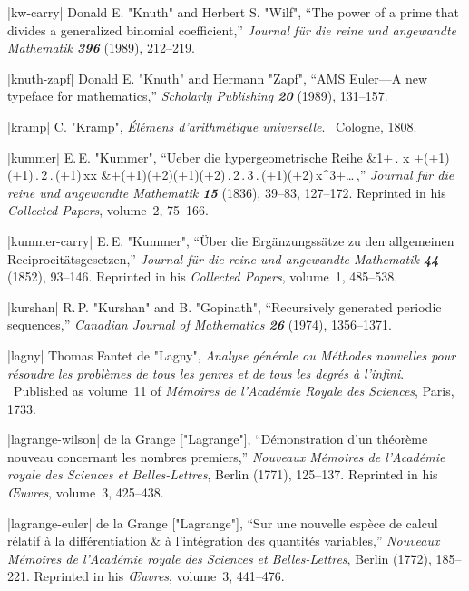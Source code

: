 \bib|kw-carry|%
Donald E. "Knuth" and Herbert S. "Wilf", ``The power of a prime that
divides a generalized binomial coefficient,'' 
{\sl Journal f\"ur die reine und angewandte Mathematik\/ \bf396} (1989),
212--219.

\bib|knuth-zapf|%
Donald E. "Knuth" and Hermann "Zapf", ``AMS Euler\dash---A new typeface
for mathematics,'' {\sl Scholarly Publishing\/ \bf20} (1989), 131--157.

\bib|kramp|%
C. "Kramp", {\sl \'El\'emens d'arithm\'etique universelle}. \
Cologne, 1808.

\bib|kummer|%
E.\,E. "Kummer", ``Ueber die hypergeometrische Reihe
\begindisplay \def\\{\,.\,} 
&1+{\alpha\beta{}\\\gamma}\,x
 +{\alpha(\alpha+1)\beta(\beta+1)\\2\\\gamma(\gamma+1)}\,xx\cr
&\qquad +{\alpha(\alpha+1)(\alpha+2)\beta(\beta+1)(\beta+2)\over
    1\\2\\3\\\gamma(\gamma+1)(\gamma+2)}\,x^3+\ldots\,\hbox{,''}
\enddisplay
{\sl Journal f\"ur die reine und angewandte Mathematik\/ \bf15}
 (1836), 39--83, 127--172. Reprinted in his {\sl Collected Papers},
volume~2, 75--166.

\bib|kummer-carry|%
E.\,E. "Kummer", ``\"Uber die Erg\"anzungss\"atze zu den allgemeinen
Reciprocit\"atsgesetzen,''
{\sl Journal f\"ur die reine und angewandte Mathematik\/ \bf44}
 (1852), 93--146. Reprinted in his {\sl Collected Papers},
 volume~1, 485--538.

\bib|kurshan|%
R.\,P. "Kurshan" and B. "Gopinath", ``Recursively generated periodic sequences,''
{\sl Canadian Journal of Mathematics\/ \bf26} (1974), 1356--1371.

\bib|lagny|%
Thomas Fantet de "Lagny", {\sl Analyse g\'en\'erale ou M\'ethodes nouvelles
pour r\'esoudre les probl\`emes de tous les genres et de tous les
degr\'es \`a l'infini}. \ Published as volume~11 of {\sl M\'emoires
de l'Acad\'emie Royale des Sciences}, Paris, 1733.

\bib|lagrange-wilson|%
de la Grange ["Lagrange"],
``D\'emonstration d'un th\'eor\`eme nouveau concernant
les nombres premiers,''
{\sl Nouveaux M\'emoires de l'Acad\'emie royale des Sciences et
Belles-Lettres}, Berlin (1771), 125--137.
Reprinted in his {\sl \OE uvres}, volume~3, 425--438.

\bib|lagrange-euler|%
de la Grange ["Lagrange"], ``Sur une nouvelle esp\`ece de calcul
 r\'elatif %
\`a la diff\'erentia\-tion \& \`a l'int\'egration des quantit\'es variables,''
{\sl Nouveaux M\'emoires de l'Acad\'emie royale des Sciences et
Belles-Lettres}, Berlin (1772), 185--221.
Reprinted in his {\sl \OE uvres}, volume~3, 441--476.


